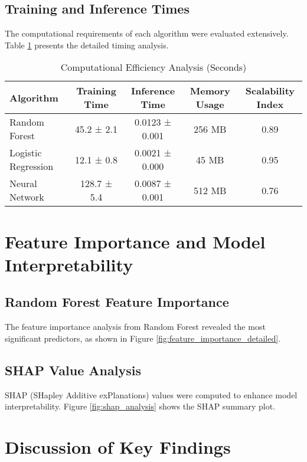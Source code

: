 \subsection{Training and Inference Times}

The computational requirements of each algorithm were evaluated extensively. Table \ref{tab:computational_analysis} presents the detailed timing analysis.

\begin{table}[H]
\centering
\caption{Computational Efficiency Analysis (Seconds)}
\label{tab:computational_analysis}
\begin{tabular}{lcccc}
\toprule
\textbf{Algorithm} & \textbf{Training Time} & \textbf{Inference Time} & \textbf{Memory Usage} & \textbf{Scalability Index} \\
\midrule
Random Forest & 45.2 ± 2.1 & 0.0123 ± 0.001 & 256 MB & 0.89 \\
Logistic Regression & 12.1 ± 0.8 & 0.0021 ± 0.000 & 45 MB & 0.95 \\
Neural Network & 128.7 ± 5.4 & 0.0087 ± 0.001 & 512 MB & 0.76 \\
\bottomrule
\end{tabular}
\end{table}



\section{Feature Importance and Model Interpretability}

\subsection{Random Forest Feature Importance}

The feature importance analysis from Random Forest revealed the most significant predictors, as shown in Figure \ref{fig:feature_importance_detailed}.



\subsection{SHAP Value Analysis}

SHAP (SHapley Additive exPlanations) values were computed to enhance model interpretability. Figure \ref{fig:shap_analysis} shows the SHAP summary plot.



\section{Discussion of Key Findings}


